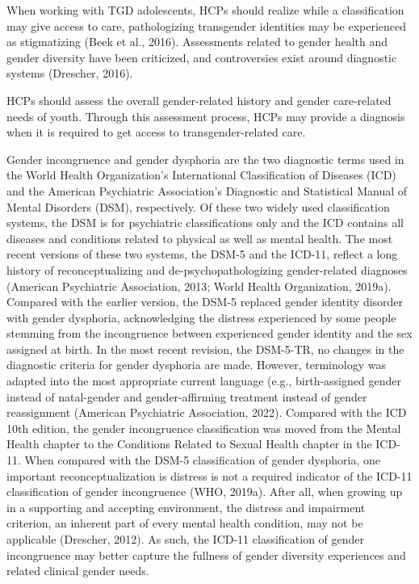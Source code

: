 \documentclass[
]{book}
\begin{document}
When working with TGD adolescents, HCPs
should realize while a classification may give
access to care, pathologizing transgender identities may be experienced as stigmatizing (Beek
et al., 2016). Assessments related to gender health
and gender diversity have been criticized, and
controversies exist around diagnostic systems
(Drescher, 2016).

HCPs should assess the overall gender-related
history and gender care-related needs of youth.
Through this assessment process, HCPs may provide a diagnosis when it is required to get access
to transgender-related care.

Gender incongruence and gender dysphoria
are the two diagnostic terms used in the World
Health Organization's International Classification
of Diseases (ICD) and the American Psychiatric
Association's Diagnostic and Statistical Manual
of Mental Disorders (DSM), respectively. Of
these two widely used classification systems, the
DSM is for psychiatric classifications only and
the ICD contains all diseases and conditions
related to physical as well as mental health. The
most recent versions of these two systems, the
DSM-5 and the ICD-11, reflect a long history
of reconceptualizing and de-psychopathologizing
gender-related diagnoses (American Psychiatric
Association, 2013; World Health Organization,
2019a). Compared with the earlier version, the
DSM-5 replaced gender identity disorder with
gender dysphoria, acknowledging the distress
experienced by some people stemming from the
incongruence between experienced gender identity and the sex assigned at birth. In the most
recent revision, the DSM-5-TR, no changes in
the diagnostic criteria for gender dysphoria are
made. However, terminology was adapted into
the most appropriate current language (e.g.,
birth-assigned gender instead of natal-gender
and gender-affirming treatment instead of gender reassignment (American Psychiatric
Association, 2022). Compared with the ICD 10th
edition, the gender incongruence classification
was moved from the Mental Health chapter to
the Conditions Related to Sexual Health chapter
in the ICD-11. When compared with the DSM-5
classification of gender dysphoria, one important
reconceptualization is distress is not a required
indicator of the ICD-11 classification of gender
incongruence (WHO, 2019a). After all, when
growing up in a supporting and accepting environment, the distress and impairment criterion,
an inherent part of every mental health condition, may not be applicable (Drescher, 2012). As
such, the ICD-11 classification of gender incongruence may better capture the fullness of gender diversity experiences and related clinical
gender needs.
\end{document}
